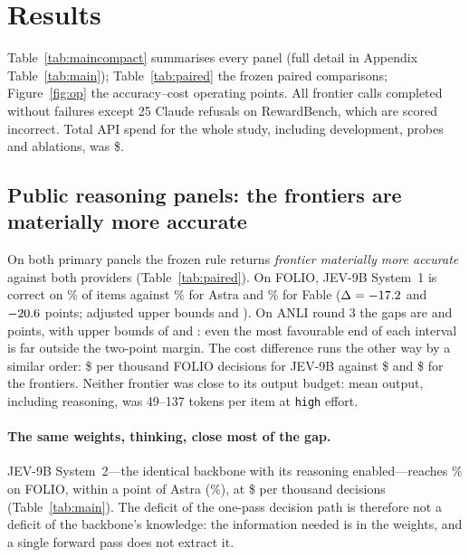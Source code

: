 \section{Results}
\label{sec:results}

Table~\ref{tab:maincompact} summarises every panel (full detail in Appendix Table~\ref{tab:main}); Table~\ref{tab:paired} the frozen paired comparisons; Figure~\ref{fig:op} the accuracy--cost operating points.
All frontier calls completed without failures except 25 Claude refusals on RewardBench, which are scored incorrect.
Total API spend for the whole study, including development, probes and ablations, was \$\ApiTotal.





\subsection{Public reasoning panels: the frontiers are materially more accurate}
\label{sec:public}
On both primary panels the frozen rule returns \emph{frontier materially more accurate} against both providers (Table~\ref{tab:paired}).
On FOLIO, JEV-9B System~1 is correct on \AccFolioSone\% of items against \AccFolioAstra\% for Astra and \AccFolioFable\% for Fable ($\Delta=-17.2$ and $-20.6$ points; adjusted upper bounds \HiFolioAstra{} and \HiFolioFable{}).
On ANLI round 3 the gaps are \DeltaAnliAstra{} and \DeltaAnliFable{} points, with upper bounds of \HiAnliAstra{} and \HiAnliFable{}: even the most favourable end of each interval is far outside the two-point margin.
The cost difference runs the other way by a similar order: \$\CostFolioSone{} per thousand FOLIO decisions for JEV-9B against \$\CostFolioAstra{} and \$\CostFolioFable{} for the frontiers.
Neither frontier was close to its output budget: mean output, including reasoning, was 49--137 tokens per item at \texttt{high} effort.

\paragraph{The same weights, thinking, close most of the gap.}
JEV-9B System~2---the identical backbone with its reasoning enabled---reaches \AccFolioStwo\% on FOLIO, within a point of Astra (\AccFolioAstra\%), at \$\CostFolioStwo{} per thousand decisions (Table~\ref{tab:main}).
The deficit of the one-pass decision path is therefore not a deficit of the backbone's knowledge: the information needed is in the weights, and a single forward pass does not extract it.

